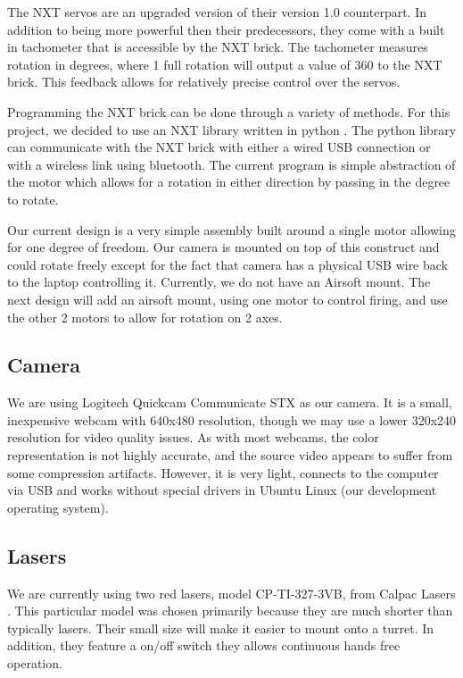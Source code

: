 \documentclass[10pt,twocolumn,letterpaper]{article}
\begin{document}
The NXT servos are an upgraded version of their version 1.0 counterpart. In addition to being more powerful then their predecessors, they come with a built in tachometer that is accessible by the NXT brick. The tachometer measures rotation in degrees, where 1 full rotation will output a value of 360 to the NXT brick. This feedback allows for relatively precise control over the servos.

Programming the NXT brick can be done through a variety of methods. For this project, we decided to use an NXT library written in python \cite{pynxt}. The python library can communicate with the NXT brick with either a wired USB connection or with a wireless link using bluetooth. The current program is simple abstraction of the motor which allows for a rotation in either direction by passing in the degree to rotate.

Our current design is a very simple assembly built around a single motor allowing for one degree of freedom. Our camera is mounted on top of this construct and could rotate freely except for the fact that camera has a physical USB wire back to the laptop controlling it. Currently, we do not have an Airsoft mount. The next design will add an airsoft mount, using one motor to control firing, and use the other 2 motors to allow for rotation on 2 axes. 
\subsection{Camera}
We are using Logitech Quickcam Communicate STX \cite{logi} as our camera.  It is a small, inexpensive webcam with 640x480 resolution, though we may use a lower 320x240 resolution for video quality issues.  As with most webcams, the color representation is not highly accurate, and the source video appears to suffer from some compression artifacts.  However, it is very light, connects to the computer via USB and works without special drivers in Ubuntu Linux (our development operating system).

\subsection{Lasers}
We are currently using two red lasers, model CP-TI-327-3VB, from Calpac Lasers \cite{calpac}. This particular model was chosen primarily because they are much shorter than typically lasers. Their small size will make it easier to mount onto a turret. In addition, they feature a on/off switch they allows continuous hands free operation.
\end{document}
